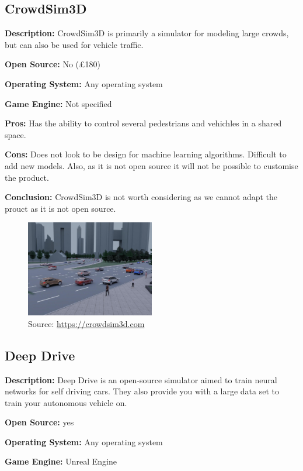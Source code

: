 \subsection{CrowdSim3D}
\textbf{Description:} CrowdSim3D is primarily a simulator for modeling large crowds, but can also be used for vehicle traffic. 

\textbf{Open Source:} No (£180)

\textbf{Operating System:} Any operating system

\textbf{Game Engine:} Not specified

\textbf{Pros:} Has the ability to control several pedestrians and vehichles in a shared space.

\textbf{Cons:} Does not look to be design for machine learning algorithms. Difficult to add new models. Also, as it is not open source it will not be possible to customise the product. 

\textbf{Conclusion:} CrowdSim3D is not worth considering as we cannot adapt the prouct as it is not open source. 

\begin{figure}[H]
    \centering
    \includegraphics[width=0.5\textwidth]{Simulators/CrowdSim.JPG}
    \caption{Source: \url{https://crowdsim3d.com}}
\end{figure}


\subsection{Deep Drive}
\textbf{Description:} Deep Drive \cite{DeepDrive_Website} is an open-source simulator aimed to train neural networks for self driving cars. They also provide you with a large data set to train your autonomous vehicle on. 

\textbf{Open Source:} yes

\textbf{Operating System:} Any operating system

\textbf{Game Engine:} Unreal Engine

